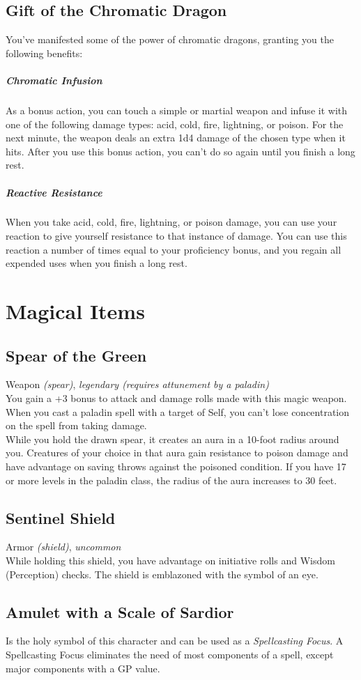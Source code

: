 \documentclass[letterpaper,openany,oneside,twocolumn]{book}
\begin{document}
\subsection*{Gift of the Chromatic Dragon}
You've manifested some of the power of chromatic dragons, granting you the following benefits:
\subparagraph*{Chromatic Infusion}
As a bonus action, you can touch a simple or martial weapon and infuse it with one of the following damage types: acid, cold, fire, lightning, or poison. For the next minute, the weapon deals an extra 1d4 damage of the chosen type when it hits. After you use this bonus action, you can't do so again until you finish a long rest.
\subparagraph*{Reactive Resistance}
When you take acid, cold, fire, lightning, or poison damage, you can use your reaction to give yourself resistance to that instance of damage. You can use this reaction a number of times equal to your proficiency bonus, and you regain all expended uses when you finish a long rest.

\section*{Magical Items}
\subsection*{Spear of the Green}
Weapon \textit{(spear)}, \textit{legendary (requires attunement by a paladin)}\\
You gain a +3 bonus to attack and damage rolls made with this magic weapon. When you cast a paladin spell with a target of Self, you can't lose concentration on the spell from taking damage.\\
While you hold the drawn spear, it creates an aura in a 10-foot radius around you. Creatures of your choice in that aura gain resistance to poison damage and have advantage on saving throws against the poisoned condition. If you have 17 or more levels in the paladin class, the radius of the aura increases to 30 feet.
\subsection*{Sentinel Shield}
Armor \textit{(shield)}, \textit{uncommon}\\
While holding this shield, you have advantage on initiative rolls and Wisdom (Perception) checks. The shield is emblazoned with the symbol of an eye.
\subsection*{Amulet with a Scale of Sardior}
Is the holy symbol of this character and can be used as a \textit{Spellcasting Focus}. A Spellcasting Focus eliminates the need of most components of a spell, except major components with a GP value.
\end{document}
